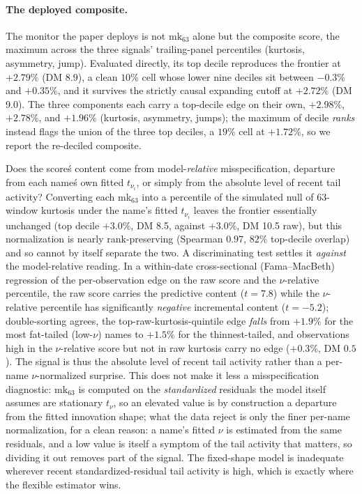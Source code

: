 \documentclass[11pt]{article}
\theoremstyle{remark}
\begin{document}
\paragraph{The deployed composite.} The monitor the paper deploys is not
$\mathrm{mk}_{63}$ alone but the composite score, the maximum across the
three signals' trailing-panel percentiles (kurtosis, asymmetry, jump).
Evaluated directly, its top decile reproduces the frontier at $+2.79\%$
(DM 8.9), a clean $10\%$ cell whose lower nine deciles sit between
$-0.3\%$ and $+0.35\%$, and it survives the strictly causal expanding
cutoff at $+2.72\%$ (DM 9.0). The three components each carry a
top-decile edge on their own, $+2.98\%$, $+2.78\%$, and $+1.96\%$
(kurtosis, asymmetry, jumps); the maximum of decile \emph{ranks}
instead flags the union of the three top deciles, a $19\%$ cell at
$+1.72\%$, so we report the re-deciled composite.

Does the score\'s content come from model-\emph{relative}
misspecification, departure from each name\'s own fitted $t_{\nu_i}$, or
simply from the absolute level of recent tail activity? Converting each
mk$_{63}$ into a percentile of the simulated null of 63-window kurtosis
under the name's fitted $t_{\nu_i}$ leaves the frontier essentially
unchanged (top decile $+3.0\%$, DM 8.5, against $+3.0\%$, DM 10.5 raw),
but this normalization is nearly rank-preserving (Spearman $0.97$, $82\%$
top-decile overlap) and so cannot by itself separate the two. A
discriminating test settles it \emph{against} the model-relative reading.
In a within-date cross-sectional (Fama--MacBeth) regression of the
per-observation edge on the raw score and the $\nu$-relative percentile,
the raw score carries the predictive content ($t=7.8$) while the
$\nu$-relative percentile has significantly \emph{negative} incremental
content ($t=-5.2$); double-sorting agrees, the top-raw-kurtosis-quintile
edge \emph{falls} from $+1.9\%$ for the most fat-tailed (low-$\nu$) names
to $+1.5\%$ for the thinnest-tailed, and observations high in the
$\nu$-relative score but not in raw kurtosis carry no edge ($+0.3\%$, DM
$0.5$). The signal is thus the absolute level of recent tail activity rather than
a per-name $\nu$-normalized surprise. This does not make it less a
misspecification diagnostic: $\mathrm{mk}_{63}$ is computed on the
\emph{standardized} residuals the model itself assumes are stationary
$t_\nu$, so an elevated value is by construction a departure from the
fitted innovation shape; what the data reject is only the finer per-name
normalization, for a clean reason: a name's fitted $\nu$ is estimated
from the same residuals, and a low value is itself a symptom of the tail
activity that matters, so dividing it out removes part of the signal. The
fixed-shape model is inadequate wherever recent standardized-residual tail
activity is high, which is exactly where the flexible estimator wins.
\end{document}
